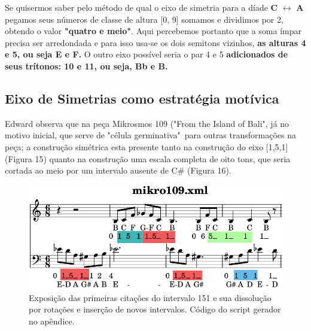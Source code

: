 \documentclass[
	12pt,				%
	openright,			%
	twoside,			%
	a4paper,			%
	english,			%
	french,				%
	spanish,			%
	brazil				%
	]{abntex2}
\begin{document}
Se quisermos saber pelo método de  qual o eixo de simetria para a díade \textbf{C} $\leftrightarrow $ \textbf{A} pegamos seus números de classe de altura [0, 9] somamos e dividimos por 2, obtendo o valor \textbf{"quatro e meio"}. Aqui percebemos portanto que a soma ímpar precisa ser arredondada e para isso usa-se os dois semitons vizinhos, \textbf{as alturas 4 e 5, ou seja E e F.} 
O outro eixo possível seria o par 4 e 5 \textbf{adicionados de seus trítonos: 10 e 11, ou seja, Bb e B.}

\subsection{Eixo de Simetrias como estratégia motívica}

Edward  observa que na peça Mikrosmos 109 ("From the Island of Bali", já no motivo inicial, que serve de "célula germinativa"\ para outras transformações na peça; a construção simétrica esta presente tanto na construção do eixo [1,5,1] (Figura 15) quanto na construção uma escala completa de oito tons, que seria cortada ao meio por um intervalo ausente de C\# (Figura 16).

\begin{figure}[!h]
	\caption{\label{fig_grafico}Exposição das primeiras citações do intervalo 151 e sua dissolução por rotações e inserção de novos intervalos. Código do script gerador no apêndice.}
	\begin{center}
	    \includegraphics[scale=0.4]{estudosM21/contornoM109.png}
	\end{center}
\end{figure}
\end{document}
